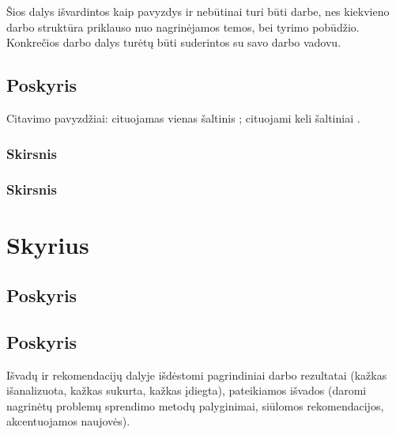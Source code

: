 \documentclass{VUMIFKompMagistrinis}
\begin{document}
Šios dalys išvardintos kaip pavyzdys ir nebūtinai turi būti darbe, nes
kiekvieno darbo struktūra priklauso nuo nagrinėjamos temos, bei tyrimo
pobūdžio. Konkrečios darbo dalys turėtų būti suderintos su savo darbo vadovu.

\subsection{Poskyris}
Citavimo pavyzdžiai: cituojamas vienas šaltinis \cite{PvzStraipsnLt}; cituojami
keli šaltiniai \cite{PvzStraipsnEn, PvzKonfLt, PvzKonfEn, PvzKnygLt, PvzKnygEn,
PvzElPubLt, PvzElPubEn, PvzMagistrLt, PvzPhdEn}.

\subsubsection{Skirsnis}
\subsubsection{Skirsnis}
\section{Skyrius}
\subsection{Poskyris}
\subsection{Poskyris}

Išvadų ir rekomendacijų dalyje išdėstomi pagrindiniai darbo rezultatai (kažkas
išanalizuota, kažkas sukurta, kažkas įdiegta), pateikiamos išvados (daromi
nagrinėtų problemų sprendimo metodų palyginimai, siūlomos rekomendacijos,
akcentuojamos naujovės).

\printbibliography  %

\appendix  %
\end{document}
